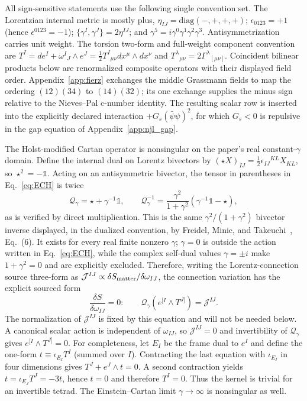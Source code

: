 \documentclass[aps,prd,twocolumn,superscriptaddress,showpacs,preprintnumbers,nofootinbib,longbibliography,floatfix]{revtex4-2}
\begin{document}
All sign-sensitive statements use the following single convention set.
The Lorentzian internal metric is mostly plus,
$\eta_{IJ}=\mathrm{diag}(-,+,+,+)$; $\epsilon_{0123}=+1$ (hence
$\epsilon^{0123}=-1$); $\{\gamma^I,\gamma^J\}=2\eta^{IJ}$; and
$\gamma^5=i\gamma^0\gamma^1\gamma^2\gamma^3$.  Antisymmetrization carries
unit weight.  The torsion two-form and full-weight component convention are
$T^I=de^I+\omega^I{}_J\wedge e^J
=\tfrac12T^I{}_{\mu\nu}dx^\mu\wedge dx^\nu$ and
$T^\lambda{}_{\mu\nu}=2\Gamma^\lambda{}_{[\mu\nu]}$.  Coincident bilinear
products below are renormalized composite operators with their displayed
field order.  Appendix~\ref{app:fierz} exchanges the middle Grassmann fields
to map the ordering $(12)(34)$ to $(14)(32)$; its one exchange supplies the
minus sign relative to the Nieves--Pal c-number identity.  The resulting
scalar row is inserted into the explicitly declared interaction
$+G_s(\bar\psi\psi)^2$, for which $G_s<0$ is repulsive in the gap equation of
Appendix~\ref{app:njl_gap}.

The Holst-modified Cartan operator is nonsingular on the paper's real
constant-$\gamma$ domain.  Define the internal dual on Lorentz bivectors by
$(\star X)_{IJ}=\tfrac12\epsilon_{IJ}{}^{KL}X_{KL}$, so
$\star^2=-\mathbb 1$.  Acting on an antisymmetric bivector, the tensor in
parentheses in Eq.~\eqref{eq:ECH} is twice
\begin{equation}\label{eq:holst_cartan_inverse}
\mathcal Q_\gamma=\star+\gamma^{-1}\mathbb 1,\qquad
\mathcal Q_\gamma^{-1}
=\frac{\gamma^2}{1+\gamma^2}
\left(\gamma^{-1}\mathbb 1-\star\right),
\end{equation}
as is verified by direct multiplication.  This is the same
$\gamma^2/(1+\gamma^2)$ bivector inverse displayed, in the dualized
convention, by Freidel, Minic, and Takeuchi~\cite{Freidel2005}, Eq.~(6).
It exists for every real finite nonzero $\gamma$; $\gamma=0$ is outside the
action written in Eq.~\eqref{eq:ECH}, while the complex self-dual values
$\gamma=\pm i$ make $1+\gamma^2=0$ and are explicitly excluded.  Therefore,
writing the Lorentz-connection source three-form as
$\mathcal J^{IJ}\propto\delta S_{\rm matter}/\delta\omega_{IJ}$, the
connection variation has the explicit sourced form
\begin{equation}\label{eq:cartan_source}
\frac{\delta S}{\delta\omega_{IJ}}=0:\qquad
\mathcal Q_\gamma\!\left(e^{[I}\wedge T^{J]}\right)=\mathcal J^{IJ}.
\end{equation}
The normalization of $\mathcal J^{IJ}$ is fixed by this equation and will not
be needed below.  A canonical scalar action is independent of
$\omega_{IJ}$, so $\mathcal J^{IJ}=0$ and invertibility of
$\mathcal Q_\gamma$ gives $e^{[I}\wedge T^{J]}=0$.
For completeness, let $E_I$ be the frame dual to $e^I$ and define the one-form
$t\equiv\iota_{E_I}T^I$ (summed over $I$).  Contracting the last equation with
$\iota_{E_I}$ in four dimensions gives
$T^J+e^J\wedge t=0$.  A second contraction yields
$t=\iota_{E_J}T^J=-3t$, hence $t=0$ and therefore $T^I=0$.  Thus the kernel is
trivial for an invertible tetrad.  The Einstein--Cartan limit
$\gamma\to\infty$ is nonsingular as well.
\end{document}
